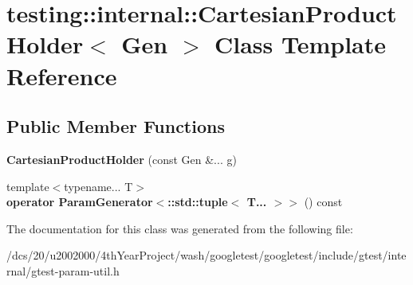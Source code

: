 \hypertarget{classtesting_1_1internal_1_1CartesianProductHolder}{}\section{testing\+:\+:internal\+:\+:Cartesian\+Product\+Holder$<$ Gen $>$ Class Template Reference}
\label{classtesting_1_1internal_1_1CartesianProductHolder}
\subsection*{Public Member Functions}
\begin{DoxyCompactItemize}
\item 
\mbox{\label{classtesting_1_1internal_1_1CartesianProductHolder_a3584d073ddbe024d6bc478a988c4111c}} 
{\bfseries Cartesian\+Product\+Holder} (const Gen \&... g)
\item 
\mbox{\label{classtesting_1_1internal_1_1CartesianProductHolder_ab29313123e08f3fc7111eac6e80351a5}} 
{\footnotesize template$<$typename... T$>$ }\\{\bfseries operator Param\+Generator$<$\+::std\+::tuple$<$ T... $>$$>$} () const
\end{DoxyCompactItemize}


The documentation for this class was generated from the following file\+:\begin{DoxyCompactItemize}
\item 
/dcs/20/u2002000/4th\+Year\+Project/wash/googletest/googletest/include/gtest/internal/gtest-\/param-\/util.\+h\end{DoxyCompactItemize}
